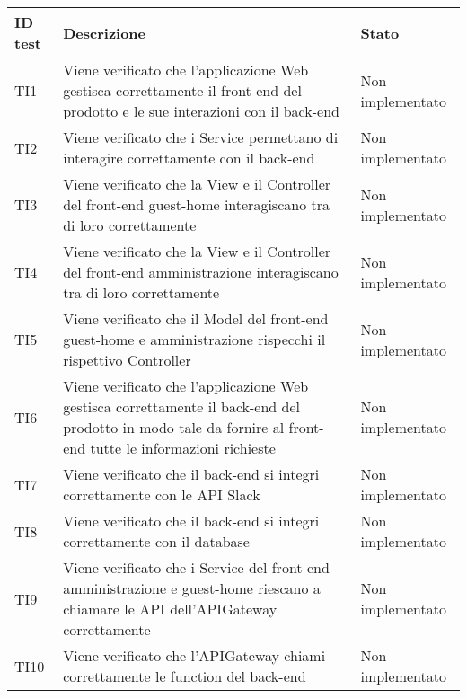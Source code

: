 \documentclass[../PianoDiQualifica.tex]{subfiles}
\begin{document}
	\begin{longtable}[c] { >{\centering\arraybackslash}p{4cm} p{7cm} >{\centering\arraybackslash}p{4cm}}
		\toprule
		\centerline{\textbf{ID test}} & \centerline{\textbf{Descrizione}} & \centerline{\textbf{Stato}} \\
			\midrule
			TI1 & Viene verificato che l'applicazione Web gestisca correttamente
il front-end del prodotto e le sue interazioni con il back-end & Non implementato \\
			\addlinespace[0.3em]
			\midrule
			\addlinespace[0.3em]
			TI2 & Viene verificato che i Service permettano di interagire correttamente con il back-end & Non implementato \\
			\addlinespace[0.3em]
			\midrule
			\addlinespace[0.3em]
			TI3 & Viene verificato che la View e il Controller del front-end guest-home interagiscano tra di loro correttamente & Non implementato \\
			\addlinespace[0.3em]
			\midrule
			\addlinespace[0.3em]
			TI4 & Viene verificato che la View e il Controller del front-end amministrazione interagiscano tra di loro correttamente & Non implementato \\
			\addlinespace[0.3em]
			\midrule
			\addlinespace[0.3em]
			TI5 & Viene verificato che il Model del front-end guest-home e amministrazione rispecchi il rispettivo Controller & Non implementato \\
			\addlinespace[0.3em]
			\midrule
			\addlinespace[0.3em]
			TI6 & Viene verificato che l'applicazione Web gestisca correttamente il back-end del prodotto in modo tale da fornire al front-end tutte le informazioni richieste & Non implementato \\
			\addlinespace[0.3em]
			\midrule
			\addlinespace[0.3em]
			TI7 & Viene verificato che il back-end si integri correttamente con le API Slack & Non implementato \\
			\addlinespace[0.3em]
			\midrule
			\addlinespace[0.3em]
			TI8 & Viene verificato che il back-end si integri correttamente con il database & Non implementato \\
			\addlinespace[0.3em]
			\midrule
			\addlinespace[0.3em]
			TI9 & Viene verificato che i Service del front-end amministrazione e guest-home riescano a chiamare le API dell'APIGateway correttamente & Non implementato \\
			\addlinespace[0.3em]
			\midrule
			\addlinespace[0.3em]	
			TI10 & Viene verificato che l'APIGateway chiami correttamente le function del back-end & Non implementato \\

\end{longtable}
\end{document}
